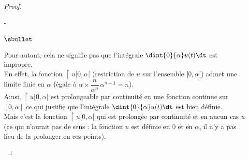 \begin{proof}
\begin{remarkL}{.97}
\begin{noliste}{-}
\begin{noliste}{$\sbullet$}
        \item Pour autant, cela ne signifie pas que l'intégrale
          $\dint{0}{\alpha} u(t) \dt$ est impropre.\\
          En effet, la fonction $\restriction{u}{[0, \alpha[}$
          (restriction de $u$ sur l'ensemble $[0, \alpha[$) 
	  admet une limite finie en $\alpha$ (égale à $\alpha
            \times \dfrac{n}{\alpha^n} \, 
             \alpha^{n-1} = n$).\\[.1cm]
	  Ainsi, $\restriction{u}{[0, \alpha[}$ est prolongeable 
	  par
          continuité en une fonction continue sur $[0, \alpha]$ ce qui
          justifie que l'intégrale $\dint{0}{\alpha} u(t) \dt$ est bien
          définie. \\
          Mais c'est la fonction $\restriction{u}{[0, \alpha[}$ qui est
          prolongée par continuité et en aucun cas $u$ (ce qui
          n'aurait pas de sens : la fonction $u$ est définie en $0$
          et en $\alpha$, il n'y a pas lieu de la prolonger en ces
          points).


\end{noliste}
\end{noliste}
\end{remarkL}
\end{proof}
